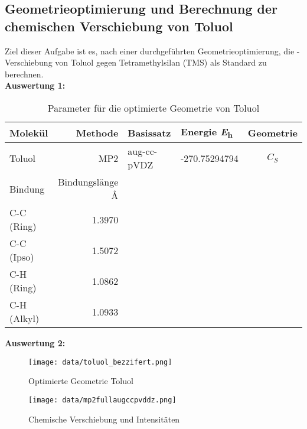 \documentclass[12pt]{article}
\begin{document}
\begin{onehalfspace}

\section{Geometrieoptimierung und Berechnung der chemischen Verschiebung von Toluol}
Ziel dieser Aufgabe ist es, nach einer durchgeführten Geometrieoptimierung, die -Verschiebung
von Toluol gegen Tetramethylsilan (TMS) als Standard zu berechnen.\\
\textbf{Auswertung 1:}\\

\begin{table}[!htpb]
\centering
\caption{ Parameter für die optimierte Geometrie von Toluol}
\begin{tabular}{lrllc}
\toprule
Molekül  & Methode & Basissatz & Energie \si{\hartree} & Geometrie \\
\midrule
 Toluol & MP2 & aug-cc-pVDZ & -270.75294794 &$C _S$\\
\midrule
 Bindung & Bindungslänge \si{\angstrom} & &  &\\
 C-C (Ring) & 1.3970 &&&\\
 C-C (Ipso) & 1.5072 &&&\\
 C-H (Ring) & 1.0862 &&&\\
 C-H (Alkyl)& 1.0933 &&&\\
\bottomrule
\end{tabular}
\end{table}

\textbf{Auswertung 2:}\\

\begin{figure}[!htpb]
\centering
  \texttt{[image: data/toluol\_bezzifert.png]}%
  \caption{Optimierte Geometrie Toluol}
\end{figure}
\begin{figure}[!htbp]
\centering
  \texttt{[image: data/mp2fullaugccpvddz.png]}%
  \caption{Chemische Verschiebung und Intensitäten}
\end{figure}


\end{onehalfspace}
\end{document}
